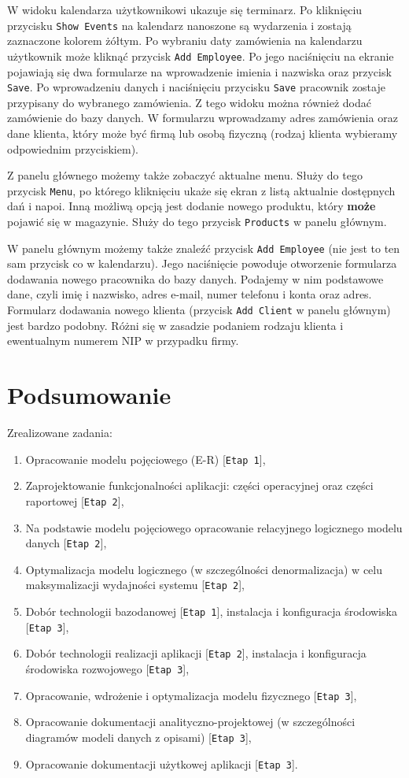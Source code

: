 \documentclass[12pt]{article}
\newcommand{\etap}[1]{[\texttt{Etap #1}]}
\begin{document}
W widoku kalendarza użytkownikowi ukazuje się terminarz. Po kliknięciu przycisku \texttt{Show Events} na kalendarz nanoszone są wydarzenia i zostają zaznaczone kolorem żółtym. Po wybraniu daty zamówienia na kalendarzu użytkownik może kliknąć przycisk \texttt{Add Employee}. Po jego naciśnięciu na ekranie pojawiają się dwa formularze na wprowadzenie imienia i nazwiska oraz przycisk \texttt{Save}. Po wprowadzeniu danych i naciśnięciu przycisku \texttt{Save} pracownik zostaje przypisany do wybranego zamówienia. Z tego widoku można również dodać zamówienie do bazy danych. W formularzu wprowadzamy adres zamówienia oraz dane klienta, który może być firmą lub osobą fizyczną (rodzaj klienta wybieramy odpowiednim przyciskiem).

Z panelu głównego możemy także zobaczyć aktualne menu. Służy do tego przycisk \texttt{Menu}, po którego kliknięciu ukaże się ekran z listą aktualnie dostępnych dań i napoi. Inną możliwą opcją jest dodanie nowego produktu, który \textbf{może} pojawić się w magazynie. Służy do tego przycisk \texttt{Products} w panelu głównym.

W panelu głównym możemy także znaleźć przycisk \texttt{Add Employee} (nie jest to ten sam przycisk co w kalendarzu). Jego naciśnięcie powoduje otworzenie formularza dodawania nowego pracownika do bazy danych. Podajemy w nim podstawowe dane, czyli imię i nazwisko, adres e-mail, numer telefonu i konta oraz adres. Formularz dodawania nowego klienta (przycisk \texttt{Add Client} w panelu głównym) jest bardzo podobny. Różni się w zasadzie podaniem rodzaju klienta i ewentualnym numerem NIP w przypadku firmy.
    
\pagebreak

\section{Podsumowanie}

\noindent Zrealizowane zadania:
\begin{enumerate}
    \item Opracowanie modelu pojęciowego (E-R) \etap{1},
    \item Zaprojektowanie funkcjonalności aplikacji: części operacyjnej oraz części raportowej \etap{2},
    \item Na podstawie modelu pojęciowego opracowanie relacyjnego logicznego modelu danych \etap{2},
    \item Optymalizacja modelu logicznego (w szczególności denormalizacja) w celu maksymalizacji wydajności systemu \etap{2},
    \item Dobór technologii bazodanowej \etap{1}, instalacja i konfiguracja środowiska \etap{3},
    \item Dobór technologii realizacji aplikacji \etap{2}, instalacja i konfiguracja środowiska rozwojowego \etap{3},
    \item Opracowanie, wdrożenie i optymalizacja modelu fizycznego \etap{3},
    \item Opracowanie dokumentacji analityczno-projektowej (w szczególności diagramów modeli danych z opisami) \etap{3},
    \item Opracowanie dokumentacji użytkowej aplikacji \etap{3}.
\end{enumerate}
\end{document}
